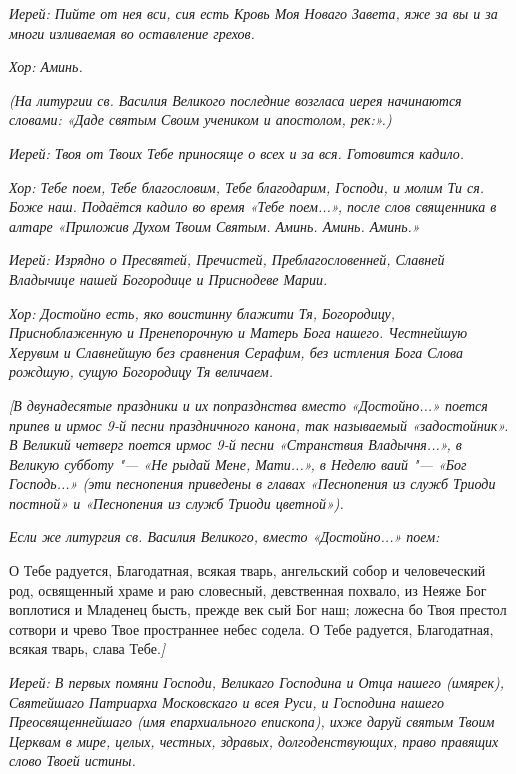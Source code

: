 \itshape Иерей:\normalfont{} Пийте от нея вси, сия есть Кровь Моя Новаго Завета, яже за вы и за многи изливаемая во оставление грехов.


\itshape Хор:\normalfont{} Аминь.


\itshape (На литургии св. Василия Великого последние возгласа иерея начинаются словами: «Даде святым Своим учеником и апостолом, рек:».)\normalfont{}


\itshape Иерей:\normalfont{} Твоя от Твоих Тебе приносяще о всех и за вся. \itshape Готовится кадило\normalfont{}.


\itshape Хор:\normalfont{} Тебе поем, Тебе благословим, Тебе благодарим, Господи, и молим Ти ся. Боже наш. \itshape Подаётся кадило во время «Тебе поем...», после слов священника в алтаре «Приложив Духом Твоим Святым. Аминь. Аминь. Аминь.»\normalfont{}


\itshape Иерей:\normalfont{} Изрядно о Пресвятей, Пречистей, Преблагословенней, Славней Владычице нашей Богородице и Приснодеве Марии.


\itshape Хор:\normalfont{} Достойно есть, яко воистинну блажити Тя, Богородицу, Присноблаженную и Пренепорочную и Матерь Бога нашего. Честнейшую Херувим и Славнейшую без сравнения Серафим, без истления Бога Слова рождшую, сущую Богородицу Тя величаем.


\itshape [В двунадесятые праздники и их попразднства вместо «Достойно...» поется припев и ирмос 9-й песни праздничного канона, так называемый «задостойник». В Великий четверг поется ирмос 9-й песни «Странствия Владычня...», в Великую субботу "--- «Не рыдай Мене, Мати...», в Неделю ваий "--- «Бог Господь...» (эти песнопения приведены в главах «Песнопения из служб Триоди постной» и «Песнопения из служб Триоди цветной»).\normalfont{}


\itshape Если же литургия св. Василия Великого, вместо «Достойно...» поем:\normalfont{}


О Тебе радуется, Благодатная, всякая тварь, ангельский собор и человеческий род, освященный храме и раю словесный, девственная похвало, из Неяже Бог воплотися и Младенец бысть, прежде век сый Бог наш; ложесна бо Твоя престол сотвори и чрево Твое пространнее небес содела. О Тебе радуется, Благодатная, всякая тварь, слава Тебе.\itshape ]\normalfont{}


\itshape Иерей:\normalfont{} В первых помяни Господи, Великаго Господина и Отца нашего \itshape (имярек),\normalfont{} Святейшаго Патриарха Московскаго и всея Руси, и Господина нашего Преосвященнейшаго \itshape (имя епархиального епископа)\normalfont{}, ихже даруй святым Твоим Церквам в мире, целых, честных, здравых, долгоденствующих, право правящих слово Твоей истины.


